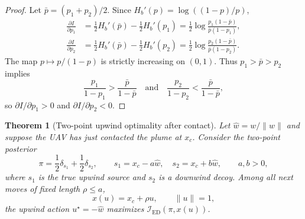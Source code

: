 \documentclass[11pt]{article}
\newtheorem{theorem}{Theorem}
\newcommand{\IED}{\mathcal{I}_{\mathrm{ED}}}
\begin{document}
\begin{proof}
Let $\bar{p}=(p_1+p_2)/2$.  Since $H_b'(p)=\log((1-p)/p)$,
\begin{align}
        \frac{\partial I}{\partial p_1}
        &=
        \frac12H_b'(\bar{p})-\frac12H_b'(p_1)
        =
        \frac12
        \log\frac{p_1(1-\bar{p})}{\bar{p}(1-p_1)},\\
        \frac{\partial I}{\partial p_2}
        &=
        \frac12H_b'(\bar{p})-\frac12H_b'(p_2)
        =
        \frac12
        \log\frac{p_2(1-\bar{p})}{\bar{p}(1-p_2)} .
\end{align}
The map $p\mapsto p/(1-p)$ is strictly increasing on $(0,1)$.  Thus $p_1>\bar{p}>p_2$ implies
\[
        \frac{p_1}{1-p_1}>\frac{\bar{p}}{1-\bar{p}}
        \quad\text{and}\quad
        \frac{p_2}{1-p_2}<\frac{\bar{p}}{1-\bar{p}},
\]
so $\partial I/\partial p_1>0$ and $\partial I/\partial p_2<0$.
\end{proof}

\begin{theorem}[Two-point upwind optimality after contact]\label{thm:p3-two-point}
Let $\widehat{w}=w/\|w\|$ and suppose the UAV has just contacted the plume at $x_c$.  Consider the two-point posterior
\[
        \pi=\frac12\delta_{s_1}+\frac12\delta_{s_2},
        \qquad
        s_1=x_c-a\widehat{w},\quad
        s_2=x_c+b\widehat{w},
        \qquad a,b>0,
\]
where $s_1$ is the true upwind source and $s_2$ is a downwind decoy.  Among all next moves of fixed length $\rho\leq a$,
\[
        x(u)=x_c+\rho u,\qquad \|u\|=1,
\]
the upwind action $u^\star=-\widehat{w}$ maximizes $\IED(\pi,x(u))$.
\end{theorem}
\end{document}
